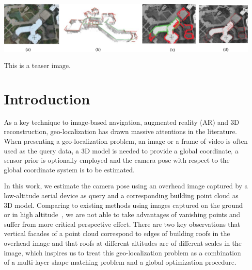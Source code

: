 \documentclass[sigconf,authorversion]{acmart}
\begin{document}



\begin{teaserfigure}
  \includegraphics[width=\textwidth]{figures/teaser_pdf}
  \caption{This is a teaser image.}
  \label{fig:teaser}
\end{teaserfigure}


\maketitle



\section{Introduction}
%
As a key technique to image-based navigation, augmented reality (AR) and 3D reconstruction, geo-localization has drawn massive attentions in the literature. When presenting a geo-localization problem, an image or a frame of video is often used as the query data, a 3D model is needed to provide a global coordinate, a sensor prior is optionally employed and the camera pose with respect to the global coordinate system is to be estimated. 

In this work, we estimate the camera pose using an overhead image captured by a low-altitude aerial device as query and a corresponding building point cloud as 3D model. Comparing to existing methods using images captured on the ground~\cite{instant} or in high altitude~\cite{FDCM}, we are not able to take advantages of vanishing points and suffer from more critical perspective effect. There are two key observations that vertical facades of a point cloud correspond to edges of building roofs in the overhead image and that roofs at different altitudes are of different scales in the image, which inspires us to treat this geo-localization problem as a combination of a multi-layer shape matching problem and a global optimization procedure. 
%
\end{document}
